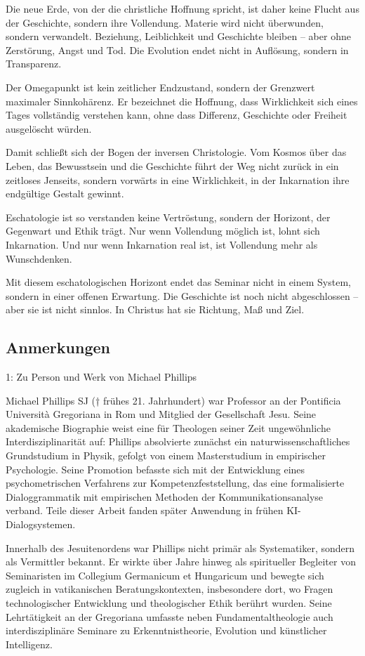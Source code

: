 \documentclass[
  ngerman,
]{article}
\begin{document}
Die neue Erde, von der die christliche Hoffnung spricht, ist daher keine
Flucht aus der Geschichte, sondern ihre Vollendung. Materie wird nicht
überwunden, sondern verwandelt. Beziehung, Leiblichkeit und Geschichte
bleiben -- aber ohne Zerstörung, Angst und Tod. Die Evolution endet
nicht in Auflösung, sondern in Transparenz.

Der Omegapunkt ist kein zeitlicher Endzustand, sondern der Grenzwert
maximaler Sinnkohärenz. Er bezeichnet die Hoffnung, dass Wirklichkeit
sich eines Tages vollständig verstehen kann, ohne dass Differenz,
Geschichte oder Freiheit ausgelöscht würden.

Damit schließt sich der Bogen der inversen Christologie. Vom Kosmos über
das Leben, das Bewusstsein und die Geschichte führt der Weg nicht zurück
in ein zeitloses Jenseits, sondern vorwärts in eine Wirklichkeit, in der
Inkarnation ihre endgültige Gestalt gewinnt.

Eschatologie ist so verstanden keine Vertröstung, sondern der Horizont,
der Gegenwart und Ethik trägt. Nur wenn Vollendung möglich ist, lohnt
sich Inkarnation. Und nur wenn Inkarnation real ist, ist Vollendung mehr
als Wunschdenken.

Mit diesem eschatologischen Horizont endet das Seminar nicht in einem
System, sondern in einer offenen Erwartung. Die Geschichte ist noch
nicht abgeschlossen -- aber sie ist nicht sinnlos. In Christus hat sie
Richtung, Maß und Ziel.

\subsection{Anmerkungen}\label{anmerkungen}

1: Zu Person und Werk von Michael Phillips

Michael Phillips SJ († frühes 21. Jahrhundert) war Professor an der
Pontificia Università Gregoriana in Rom und Mitglied der Gesellschaft
Jesu. Seine akademische Biographie weist eine für Theologen seiner Zeit
ungewöhnliche Interdisziplinarität auf: Phillips absolvierte zunächst
ein naturwissenschaftliches Grundstudium in Physik, gefolgt von einem
Masterstudium in empirischer Psychologie. Seine Promotion befasste sich
mit der Entwicklung eines psychometrischen Verfahrens zur
Kompetenzfeststellung, das eine formalisierte Dialoggrammatik mit
empirischen Methoden der Kommunikationsanalyse verband. Teile dieser
Arbeit fanden später Anwendung in frühen KI-Dialogsystemen.

Innerhalb des Jesuitenordens war Phillips nicht primär als Systematiker,
sondern als Vermittler bekannt. Er wirkte über Jahre hinweg als
spiritueller Begleiter von Seminaristen im Collegium Germanicum et
Hungaricum und bewegte sich zugleich in vatikanischen
Beratungskontexten, insbesondere dort, wo Fragen technologischer
Entwicklung und theologischer Ethik berührt wurden. Seine Lehrtätigkeit
an der Gregoriana umfasste neben Fundamentaltheologie auch
interdisziplinäre Seminare zu Erkenntnistheorie, Evolution und
künstlicher Intelligenz.
\end{document}
